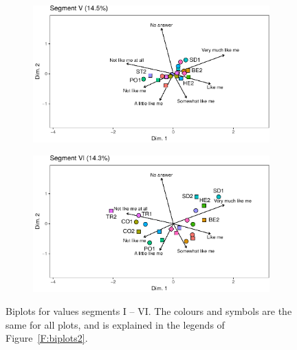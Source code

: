 \documentclass[12pt,letter]{article}\usepackage[]{graphicx}\usepackage[]{xcolor}
\begin{document}
\begin{figure}
\bigskip
\begin{subfigure}{.5\textwidth}
   \includegraphics[width=\textwidth]{figures/Paper-biplots-5-edit2}
\end{subfigure}
\hfill
\begin{subfigure}{.5\textwidth}
   \includegraphics[width=\textwidth]{figures/Paper-biplots-6-edit2}
\end{subfigure} 
\caption{Biplots for values segments I -- VI. The colours and symbols are the same for all plots, and is explained in the legends of Figure~\ref{F:biplots2}.}\label{F:biplots1}
\end{figure}
\end{document}
